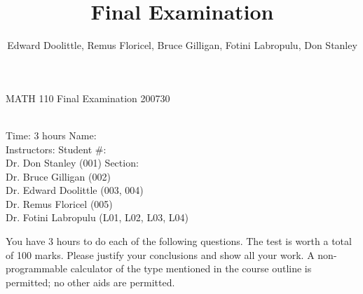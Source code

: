 \documentclass[12pt]{article}
\title{Final Examination}
\author{Edward Doolittle, Remus Floricel, Bruce Gilligan, Fotini Labropulu, Don Stanley}
\begin{document}
\thispagestyle{plain}

\begin{center}
  \LARGE{MATH 110 Final Examination 200730}
\end{center}

\begin{flushleft}
\quad\\
Time:  3 hours                  \hfill       Name: \underline{\hspace{2in}}  \\
Instructors:                    \hfill Student \#: \underline{\hspace{2in}}  \\
\quad Dr. Don Stanley (001) \hfill    Section: \underline{\hspace{2in}}  \\
\quad Dr. Bruce Gilligan (002)                                           \\
\quad Dr. Edward Doolittle (003, 004)                                    \\
\quad Dr. Remus Floricel (005)                                           \\
\quad Dr. Fotini Labropulu (L01, L02, L03, L04)                          \\
\end{flushleft}


\noindent
You have 3 hours to do each of the following questions.
The test is worth a total of 100 marks.
Please justify your conclusions and
show all your work.
A non-programmable calculator of the type mentioned in the course outline
is permitted; no other aids are permitted.
\end{document}
